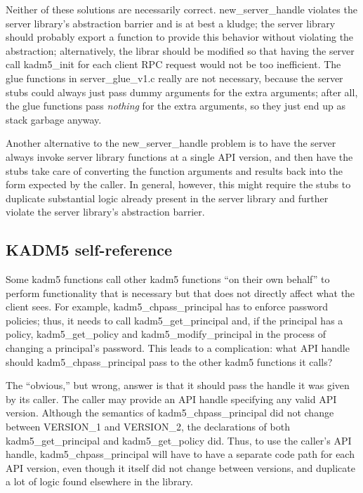 Neither of these solutions are necessarily correct.  new_server_handle
violates the server library's abstraction barrier and is at best a
kludge; the server library should probably export a function to
provide this behavior without violating the abstraction;
alternatively, the librar should be modified so that having the server
call kadm5_init for each client RPC request would not be too
inefficient.  The glue functions in server_glue_v1.c really are not
necessary, because the server stubs could always just pass dummy
arguments for the extra arguments; after all, the glue functions pass
{\it nothing} for the extra arguments, so they just end up as stack
garbage anyway.

Another alternative to the new_server_handle problem is to have the
server always invoke server library functions at a single API version,
and then have the stubs take care of converting the function arguments
and results back into the form expected by the caller.  In general,
however, this might require the stubs to duplicate substantial logic
already present in the server library and further violate the server
library's abstraction barrier.

\subsection{KADM5 self-reference}

Some kadm5 functions call other kadm5 functions ``on their own
behalf'' to perform functionality that is necessary but that does not
directly affect what the client sees.  For example,
kadm5_chpass_principal has to enforce password policies; thus, it
needs to call kadm5_get_principal and, if the principal has a policy,
kadm5_get_policy and kadm5_modify_principal in the process of changing
a principal's password.  This leads to a complication: what API handle
should kadm5_chpass_principal pass to the other kadm5 functions it
calls?

The ``obvious,'' but wrong, answer is that it should pass the handle
it was given by its caller.  The caller may provide an API handle
specifying any valid API version.  Although the semantics of
kadm5_chpass_principal did not change between VERSION_1 and VERSION_2,
the declarations of both kadm5_get_principal and kadm5_get_policy
did.  Thus, to use the caller's API handle, kadm5_chpass_principal
will have to have a separate code path for each API version, even
though it itself did not change between versions, and duplicate a lot
of logic found elsewhere in the library.


